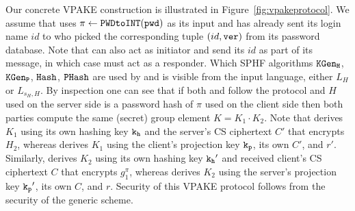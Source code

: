 Our concrete VPAKE construction is illustrated in Figure~\ref{fig:vpakeprotocol}. 
We assume that \Client uses $\pi\gets\texttt{PWDtoINT}(\mathtt{pwd})$ as its input and has already sent its login name $id$ to \Server who picked the corresponding tuple $(id,\mathtt{ver})$ from its password database. 
Note that \Client can also act as initiator and send its $id$ as part of its message, in which case \Server must act as a responder. 
Which SPHF algorithms $\mathtt{KGen_H}$, $\mathtt{KGen_P}$, $\mathtt{Hash}$, $\mathtt{PHash}$ are used by \Client and \Server is visible from the input language, either $L_H$ or $L_{s_H,H}$. 
By inspection one can see that if both \Client and \Server follow the protocol and $H$ used on the server side is a password hash of $\pi$ used on the client side then both parties compute the same (secret) group element $K=K_1\cdot K_2$. 
Note that \Client derives $K_1$ using its own hashing key $\mathtt{k_h}$ and the server's \ac{CS} ciphertext $C'$ that encrypts $H_2$, whereas \Server derives $K_1$ using the client's projection key $\mathtt{k_p}$, its own $C'$, and $r'$. 
Similarly, \Server derives $K_2$ using its own hashing key $\mathtt{k_h}'$ and received client's \ac{CS} ciphertext $C$ that encrypts $g_1^\pi$, whereas \Client derives $K_2$ using the server's projection key $\mathtt{k_p}'$, its own $C$, and $r$. 
Security of this \ac{VPAKE} protocol follows from the security of the generic scheme.

%
%
